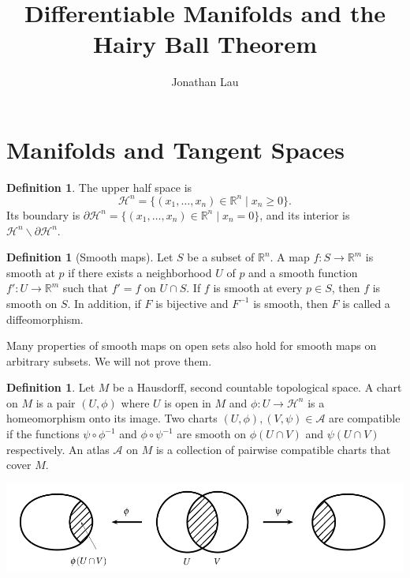 \documentclass[]{article}
\theoremstyle{definition}
\theoremstyle{definition}
\newtheorem{definition}[theorem]{Definition} %
\begin{document}
\title{Differentiable Manifolds and the Hairy Ball Theorem}
\author{Jonathan Lau}
\maketitle

\section{Manifolds and Tangent Spaces}

\begin{definition}
    The upper half space is \[\mathcal{H}^n=\{(x_1, \dots, x_n)\in \mathbb{R}^n\mid x_n \geq 0\}.\] Its boundary is $\partial \mathcal{H}^n = \{(x_1, \dots, x_n)\in \mathbb{R}^n\mid x_n = 0\}$, and its interior is $\mathcal{H}^n \backslash \partial \mathcal{H}^n $.
\end{definition}

\begin{definition}[Smooth maps]
    Let $S$ be a subset of $\mathbb{R}^n$. A map $f:S \rightarrow \mathbb{R}^m$ is smooth at $p$ if there exists a neighborhood $U$ of $p$ and a smooth function $f':U \rightarrow \mathbb{R}^m$ such that $f'=f$ on $U\cap S$. If $f$ is smooth at every $p\in S$, then $f$ is smooth on $S$.
    In addition, if $F$ is bijective and $F^{-1}$ is smooth, then $F$ is called a diffeomorphism.
\end{definition}

Many properties of smooth maps on open sets also hold for smooth maps on arbitrary subsets. We will not prove them.

\begin{definition}
    Let $M$ be a Hausdorff, second countable topological space. A chart on $M$ is a pair $(U, \phi)$ where $U$ is open in $M$ and $\phi:U\rightarrow \mathcal{H}^n$ is a homeomorphism onto its image. Two charts $(U,\phi),(V,\psi)\in \mathcal{A}$ are compatible if the functions $\psi\circ\phi^{-1}$ and $\phi\circ\psi^{-1}$ are smooth on $\phi(U\cap V)$ and $\psi(U\cap V)$ respectively. An atlas $\mathcal{A}$ on $M$ is a collection of pairwise compatible charts that cover $M$.
\end{definition}


\begin{center}
    \includegraphics[scale=0.5]{compatible.png}
\end{center}
\end{document}
